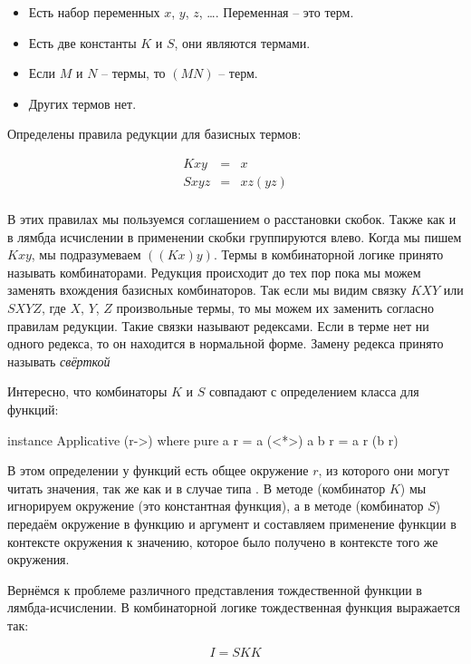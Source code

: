 \begin{itemize}
\item Есть набор переменных $x$, $y$, $z$, \dots. Переменная -- это терм.
\item Есть две константы $K$ и $S$, они являются термами.
\item Если $M$ и $N$ -- термы, то $(MN)$ -- терм.
\item Других термов нет.
\end{itemize}

Определены правила редукции для базисных термов:

\begin{eqnarray*}
Kxy  &=& x \\
Sxyz &=& xz(yz) \\
\end{eqnarray*}

В этих правилах мы пользуемся соглашением о расстановки скобок.
Также как и в лямбда исчислении в применении скобки группируются
влево. Когда мы пишем $Kxy$, мы подразумеваем $((Kx)y)$. Термы
в комбинаторной логике принято называть комбинаторами. 
Редукция происходит до тех пор пока мы можем заменять 
вхождения базисных комбинаторов. Так если мы видим связку
$KXY$ или $SXYZ$, где $X$, $Y$, $Z$ произвольные термы, то
мы можем их заменить согласно правилам редукции. Такие связки
называют редексами. Если в терме нет ни одного редекса, то
он находится в нормальной форме. Замену редекса принято 
называть \emph{свёрткой}

Интересно, что комбинаторы $K$ и $S$ совпадают с определением
класса  для функций:

\begin{code}
instance Applicative (r->) where
    pure a r = a
    (<*>) a b r = a r (b r)
\end{code}

В этом определении у функций есть общее окружение $r$, из которого
они могут читать значения, так же как и в случае типа .
В методе  (комбинатор $K$) мы игнорируем окружение
(это константная функция), а в методе \In{<*>} (комбинатор $S$) 
передаём окружение в функцию и аргумент и составляем применение
функции в контексте окружения  к значению, которое было получено
в контексте того же окружения.

Вернёмся к проблеме различного представления тождественной
функции в лямбда-исчислении. В комбинаторной логике 
тождественная функция выражается так:

\[ I = SKK \]


